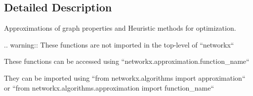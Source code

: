 \subsection{Detailed Description}
\begin{DoxyVerb}Approximations of graph properties and Heuristic methods for optimization.

    .. warning:: These functions are not imported in the top-level of ``networkx``

    These functions can be accessed using
    ``networkx.approximation.function_name``

    They can be imported using ``from networkx.algorithms import approximation``
    or ``from networkx.algorithms.approximation import function_name``\end{DoxyVerb}
 